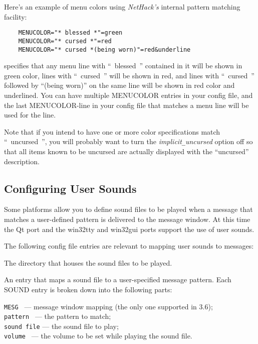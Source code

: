 Here's an example of menu colors using {\it NetHack's\/} internal
pattern matching facility:

\begin{verbatim}
    MENUCOLOR="* blessed *"=green
    MENUCOLOR="* cursed *"=red
    MENUCOLOR="* cursed *(being worn)"=red&underline
\end{verbatim}

specifies that any menu line with ``~blessed~'' contained
in it will be shown in green color, lines with ``~cursed~'' will be
shown in red, and lines with ``~cursed~'' followed by ``(being worn)''
on the same line will be shown in red color and underlined.
You can have multiple MENUCOLOR entries in your config file,
and the last MENUCOLOR-line in your config file that matches
a menu line will be used for the line.

Note that if you intend to have one or more color specifications match
``~uncursed~'', you will probably want to turn the
{\it implicit\verb+_+uncursed\/}
option off so that all items known to be uncursed are actually
displayed with the ``uncursed'' description.

\subsection*{Configuring User Sounds}

Some platforms allow you to define sound files to be played when a message
that matches a user-defined pattern is delivered to the message window.
At this time the Qt port and the win32tty and win32gui ports support the
use of user sounds.

The following config file entries are relevant to mapping user sounds
to messages:

\blist{}
\item[\ib{SOUNDDIR}]
The directory that houses the sound files to be played.
\item[\ib{SOUND}]
An entry that maps a sound file to a user-specified message pattern.
Each SOUND entry is broken down into the following parts:

{\tt MESG      } --- message window mapping (the only one supported in 3.6);\\
{\tt pattern   } --- the pattern to match;\\
{\tt sound file} --- the sound file to play;\\
{\tt volume    } --- the volume to be set while playing the sound file.
\elist

